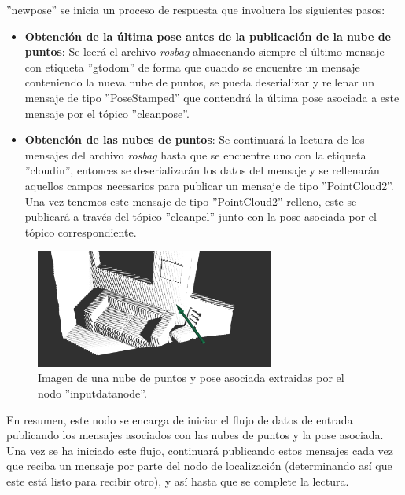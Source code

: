 \documentclass[12pt, a4paper, twoside]{article}
\begin{document}
\begin{itemize}
  ''new\textunderscore pose'' se inicia un proceso de respuesta que involucra los siguientes pasos:
  \begin{itemize}
    \item \textbf{Obtención de la última pose antes de la publicación de la nube de puntos}: Se leerá el archivo \textit{rosbag} almacenando siempre el último mensaje con etiqueta 
    ''gt\textunderscore odom'' de forma que cuando se encuentre un mensaje conteniendo la nueva nube de puntos, se pueda deserializar y rellenar un mensaje de tipo ''PoseStamped'' 
    que contendrá la última pose asociada a este mensaje por el tópico ''clean\textunderscore pose''.
    \item \textbf{Obtención de las nubes de puntos}: Se continuará la lectura de los mensajes del archivo \textit{rosbag} hasta que se encuentre uno con la etiqueta 
    ''cloud\textunderscore in'', entonces se deserializarán los datos del mensaje y se rellenarán aquellos campos necesarios para publicar un mensaje de tipo ''PointCloud2''.
    Una vez tenemos este mensaje de tipo ''PointCloud2'' relleno, este se publicará a través del tópico ''clean\textunderscore pcl'' junto con la pose asociada por el tópico 
    correspondiente.
  \end{itemize}
\end{itemize}

\begin{figure}[h]
  \centering
    \includegraphics[width=0.7\textwidth]{rosbag_output.png}
  \caption{Imagen de una nube de puntos y pose asociada extraidas por el nodo ''input\textunderscore data\textunderscore node''.}
\end{figure}

En resumen, este nodo se encarga de iniciar el flujo de datos de entrada publicando los mensajes asociados con las nubes de puntos y la pose asociada. Una vez se ha iniciado
este flujo, continuará publicando estos mensajes cada vez que reciba un mensaje por parte del nodo de localización (determinando así que este está listo para recibir otro),
y así hasta que se complete la lectura.
\end{document}
